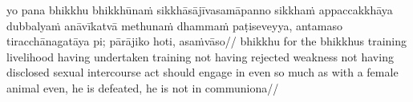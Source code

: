 \documentclass{article}
\begin{document}
\exdisplay
\begingl
\gla yo pana	bhikkhu bhikkhūnaṁ sikkhāsājīvasamāpanno sikkhaṁ appaccakkhāya dubbalyaṁ anāvīkatvā methunaṁ dhammaṁ paṭiseveyya, antamaso tiracchānagatāya pi; pārājiko hoti, asaṁvāso//
\glb  bhikkhu for the bhikkhus training livelihood having undertaken training not having rejected weakness not having disclosed sexual intercourse act should engage in even so much as with a female animal even, he is defeated, he is not in communiona//
\endgl
\xe
\end{document}
